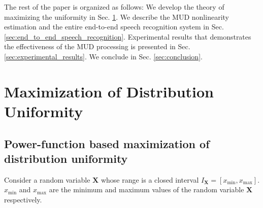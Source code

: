 \documentclass[a4paper]{article}
\begin{document}
The rest of the paper is organized as follows: We develop the theory of
maximizing the uniformity in Sec. \ref{sec:mud_theory}. We describe
the MUD nonlinearity estimation and the entire end-to-end speech
recognition system in Sec. \ref{sec:end_to_end_speech_recognition}.
Experimental results that demonstrates the effectiveness of the MUD processing
is presented in Sec.  \ref{sec:experimental_results}. We conclude in Sec.
\ref{sec:conclusion}.
%
%
%
\section{Maximization of Distribution Uniformity}
\label{sec:mud_theory}
%
\subsection{Power-function based maximization of distribution uniformity}
\label{sec:power_function_based_mud}
%
Consider a random variable $\mathbf{X}$ whose range is a closed interval
$I_{\mathbf{X}} = \left[x_{\text{min}}, x_{\text{max}} \right]$. 
$x_{\text{min}}$ and  $x_{\text{max}}$ are the minimum and maximum
values of the random variable $\mathbf{X}$ respectively.
\end{document}
